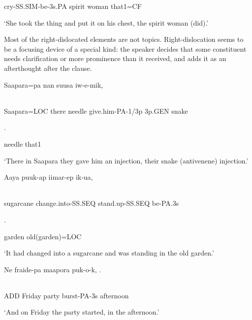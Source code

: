 cry-SS.SIM-be-3s.PA  spirit  woman  that1=CF

`She took the thing and put it on his chest, the spirit woman (did).'

Most of the right-dislocated elements are not topics. Right-dislocation seems to be a focusing device of a special kind: the speaker decides that some constituent needs clarification or more prominence than it received, and adds it as an afterthought after the clause.

\ea%
\label{ex:x1746}
\gll Saapara=pa  nan  suusa  iw-e-mik,   \\
      \\
\glt
\z

Saapara=LOC  there  needle  give.him-PA-1/3p  3p.GEN  snake

.

needle  that1

`There in Saapara they gave him an injection, their snake (antivenene) injection.'

\ea%
\label{ex:x1747}
\gll Aaya  puuk-ap  iimar-ep  ik-ua,  \\
      \\
\glt
\z

sugarcane  change.into-SS.SEQ  stand.up-SS.SEQ  be-PA.3s  

 \textstyleEmphasizedVernacularWords{} .

garden  old(garden)=LOC

`It had changed into a sugarcane and was standing in the old garden.'

\ea%
\label{ex:x1748}
\gll Ne  fraide-pa  maapora  puk-o-k,  . \\
      \\
\glt
\z

ADD  Friday  party  burst-PA-3s  afternoon

`And on Friday the party started, in the afternoon.'


